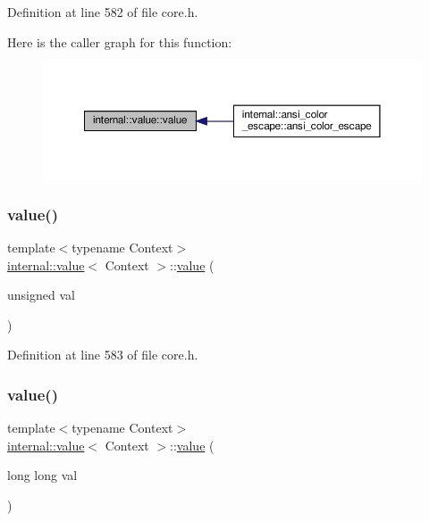 Definition at line 582 of file core.\+h.

Here is the caller graph for this function\+:
\nopagebreak
\begin{figure}[H]
\begin{center}
\leavevmode
\includegraphics[width=350pt]{classinternal_1_1value_a59a76211dd5b2b104ea8bb58d81a975d_icgraph}
\end{center}
\end{figure}
\mbox{\label{classinternal_1_1value_a075792e814700f12afee1e03d474c6bf}} 
\subsubsection{\texorpdfstring{value()}{value()}\hspace{0.1cm}{\footnotesize\ttfamily [2/12]}}
{\footnotesize\ttfamily template$<$typename Context$>$ \\
\hyperlink{classinternal_1_1value}{internal\+::value}$<$ Context $>$\+::\hyperlink{classinternal_1_1value}{value} (\begin{DoxyParamCaption}\item[{unsigned}]{val }\end{DoxyParamCaption})\hspace{0.3cm}{\ttfamily [inline]}}



Definition at line 583 of file core.\+h.

\mbox{\label{classinternal_1_1value_ad92f045a90d011f8d17fb7a334bb60b5}} 
\subsubsection{\texorpdfstring{value()}{value()}\hspace{0.1cm}{\footnotesize\ttfamily [3/12]}}
{\footnotesize\ttfamily template$<$typename Context$>$ \\
\hyperlink{classinternal_1_1value}{internal\+::value}$<$ Context $>$\+::\hyperlink{classinternal_1_1value}{value} (\begin{DoxyParamCaption}\item[{long long}]{val }\end{DoxyParamCaption})\hspace{0.3cm}{\ttfamily [inline]}}



